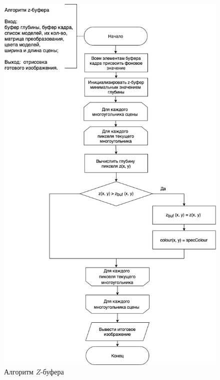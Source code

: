 \begin{figure}[H]
	\centering
	\includegraphics[scale=0.6]{include/zbuf.png}
	\caption{Алгоритм $Z$-буфера}
	\label{img:r1}
\end{figure} 

